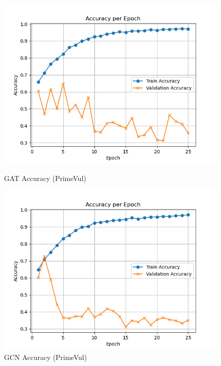 \documentclass{article}
\begin{document}
\begin{figure}[h]
    \begin{minipage}{0.32\textwidth}
        \centering
        \includegraphics[width=\textwidth]{pv_gat_acc.png}
        \caption{GAT Accuracy (PrimeVul)}
        \label{fig:pv_gat_acc}
    \end{minipage}
    \hfill
    \begin{minipage}{0.32\textwidth}
        \centering
        \includegraphics[width=\textwidth]{pv_gcn_acc.png}
        \caption{GCN Accuracy (PrimeVul)}
        \label{fig:pv_gcn_acc}
    \end{minipage}
    \hfill
    \begin{minipage}{0.32\textwidth}
        \centering

\end{minipage}
\end{figure}
\end{document}
